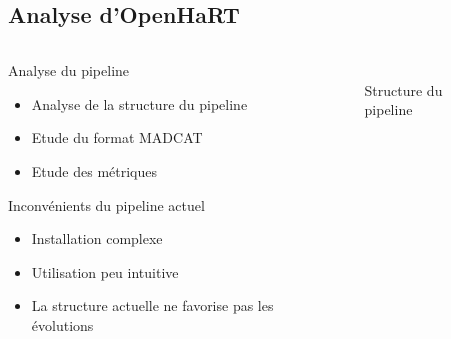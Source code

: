 \documentclass[c]{beamer}
\begin{document}
\subsection{Analyse d'OpenHaRT}
\begin{frame}
\begin{columns}[c]
\begin{column}{.6\textwidth}
    \begin{block}{Analyse du pipeline}
        \begin{itemize}
            \item Analyse de la structure du pipeline
            \item Etude du format MADCAT
            \item Etude des métriques
        \end{itemize}
    \end{block}
    \begin{block}{Inconvénients du pipeline actuel}
        \begin{itemize}
            \item Installation complexe
            \item Utilisation peu intuitive
            \item La structure actuelle ne favorise pas les évolutions
        \end{itemize}
    \end{block}
\end{column}
\begin{column}{.4\textwidth}
\begin{figure}
\\Structure du pipeline
\end{figure}
\end{column}
\end{columns}
\end{frame}
\end{document}
